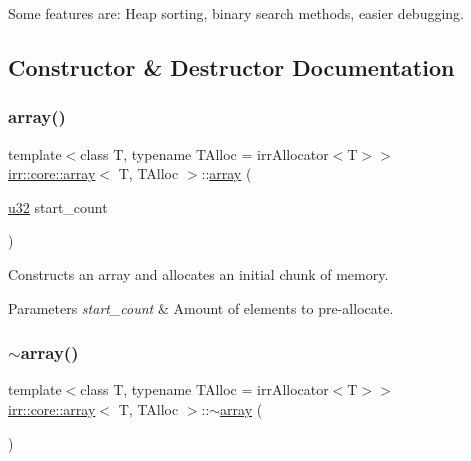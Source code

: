 Some features are\+: Heap sorting, binary search methods, easier debugging. 

\subsection{Constructor \& Destructor Documentation}
\mbox{\label{classirr_1_1core_1_1array_ab58c4b2c09693190b43ee16e99722b43}} 
\subsubsection{\texorpdfstring{array()}{array()}\hspace{0.1cm}{\footnotesize\ttfamily [1/2]}}
{\footnotesize\ttfamily template$<$class T, typename T\+Alloc = irr\+Allocator$<$\+T$>$$>$ \\
\hyperlink{classirr_1_1core_1_1array}{irr\+::core\+::array}$<$ T, T\+Alloc $>$\+::\hyperlink{classirr_1_1core_1_1array}{array} (\begin{DoxyParamCaption}\item[{\hyperlink{namespaceirr_a0416a53257075833e7002efd0a18e804}{u32}}]{start\+\_\+count }\end{DoxyParamCaption})\hspace{0.3cm}{\ttfamily [inline]}}



Constructs an array and allocates an initial chunk of memory. 


\begin{DoxyParams}{Parameters}
{\em start\+\_\+count} & Amount of elements to pre-\/allocate. \\
\hline
\end{DoxyParams}
\mbox{\label{classirr_1_1core_1_1array_aac1853f45d4c18feaacac9859efe9836}} 
\subsubsection{\texorpdfstring{$\sim$array()}{~array()}\hspace{0.1cm}{\footnotesize\ttfamily [1/2]}}
{\footnotesize\ttfamily template$<$class T, typename T\+Alloc = irr\+Allocator$<$\+T$>$$>$ \\
\hyperlink{classirr_1_1core_1_1array}{irr\+::core\+::array}$<$ T, T\+Alloc $>$\+::$\sim$\hyperlink{classirr_1_1core_1_1array}{array} (\begin{DoxyParamCaption}{ }\end{DoxyParamCaption})\hspace{0.3cm}{\ttfamily [inline]}}



